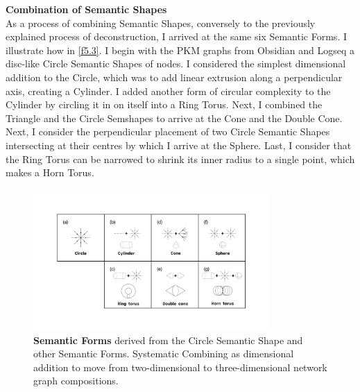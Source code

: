 \noindent \textbf{Combination of Semantic Shapes}
\\
As a process of combining Semantic Shapes, conversely to the previously explained process of deconstruction, I arrived at the same six Semantic Forms. I illustrate how in \autoref{f5.3}. I begin with the PKM graphs from Obsidian and Logseq a disc-like Circle Semantic Shapes of nodes. I considered the simplest dimensional addition to the Circle, which was to add linear extrusion along a perpendicular axis, creating a Cylinder. I added another form of circular complexity to the Cylinder by circling it in on itself into a Ring Torus. Next, I combined the Triangle and the Circle Semshapes to arrive at the Cone and the Double Cone. Next,  I consider the perpendicular placement of two Circle Semantic Shapes intersecting at their centres by which I arrive at the Sphere. Last, I consider that the Ring Torus can be narrowed to shrink its inner radius to a single point, which makes a Horn Torus.
\clearpage
   
 
\FloatBarrier
\begin{figure}[p] %
    \centering
    \includegraphics[width=0.8\textwidth]{figures/5.3.png}
    \caption[Semantic Forms derived from the Circle Semantic Shape and other Semantic Forms]
    {\textbf{Semantic Forms} derived from the Circle Semantic Shape and other Semantic Forms. Systematic Combining as dimensional addition to move from two-dimensional to three-dimensional network graph compositions.}
    \label{f5.3}
\end{figure}

